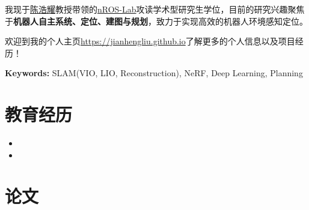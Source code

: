 \documentclass[11pt,a4paper,sans]{moderncv}        %
\begin{document}
\makecvtitle

{我现于\href{faculty.hitsz.edu.cn/chenhaoyao}{陈浩耀}教授带领的\href{http://nrs-lab.com/}{nROS-Lab}攻读学术型研究生学位，目前的研究兴趣聚焦于\textbf{机器人自主系统、定位、建图与规划}，致力于实现高效的机器人环境感知定位。

欢迎到我的个人主页\href{https://jianhengliu.github.io}{https://jianhengliu.github.io}了解更多的个人信息以及项目经历！
}

\textbf{Keywords:} SLAM(VIO, LIO, Reconstruction), NeRF, Deep Learning, Planning

\section{教育经历}

\begin{itemize}

\item{}

\item{}

\end{itemize}

\vspace{2pt}

\section{论文}
\end{document}
